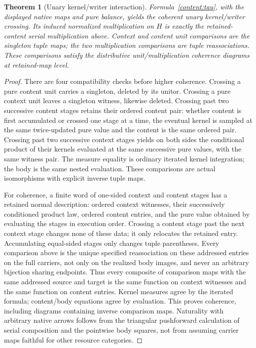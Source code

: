 \documentclass[11pt]{article}
\newtheorem{theorem}{Theorem}[section]
\begin{document}
\begin{theorem}[Unary kernel/writer interaction]\label{content:unary}
Formula~\eqref{content:tau}, with the displayed native maps and pure balance, yields the coherent unary kernel/writer crossing. Its induced normalized multiplication on $H$ is exactly the retained-content serial multiplication above. Context and content unit comparisons are the singleton tuple maps; the two multiplication comparisons are tuple reassociations. These comparisons satisfy the distributive unit/multiplication coherence diagrams at retained-map level.
\end{theorem}
\begin{proof}
There are four compatibility checks before higher coherence. Crossing a pure content unit carries a singleton, deleted by its unitor. Crossing a pure context unit leaves a singleton witness, likewise deleted. Crossing past two successive content stages retains their ordered content pair: whether content is first accumulated or crossed one stage at a time, the eventual kernel is sampled at the same twice-updated pure value and the content is the same ordered pair. Crossing past two successive context stages yields on both sides the conditional product of their kernels evaluated at the same successive pure values, with the same witness pair. The measure equality is ordinary iterated kernel integration; the body is the same nested evaluation. These comparisons are actual isomorphisms with explicit inverse tuple maps.

For coherence, a finite word of one-sided context and content stages has a retained normal description: ordered context witnesses, their successively conditioned product law, ordered content entries, and the pure value obtained by evaluating the stages in execution order. Crossing a content stage past the next context stage changes none of these data; it only relocates the retained entry. Accumulating equal-sided stages only changes tuple parentheses. Every comparison above is the unique specified reassociation on these addressed entries on the full carriers, not only on the realized body images, and never an arbitrary bijection sharing endpoints. Thus every composite of comparison maps with the same addressed source and target is the same function on context witnesses and the same function on content entries. Kernel measures agree by the iterated formula; content/body equations agree by evaluation. This proves coherence, including diagrams containing inverse comparison maps. Naturality with arbitrary native arrows follows from the triangular pushforward calculation of serial composition and the pointwise body squares, not from assuming carrier maps faithful for other resource categories.


\end{proof}
\end{document}
